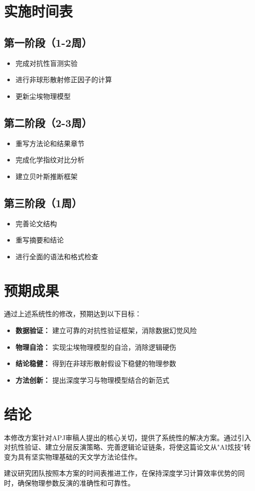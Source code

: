 \documentclass[12pt]{article}
\begin{document}
\section{实施时间表}

\subsection{第一阶段（1-2周）}

\begin{itemize}[leftmargin=*]
\item 完成对抗性盲测实验
\item 进行非球形散射修正因子的计算
\item 更新尘埃物理模型
\end{itemize}

\subsection{第二阶段（2-3周）}

\begin{itemize}[leftmargin=*]
\item 重写方法论和结果章节
\item 完成化学指纹对比分析
\item 建立贝叶斯推断框架
\end{itemize}

\subsection{第三阶段（1周）}

\begin{itemize}[leftmargin=*]
\item 完善论文结构
\item 重写摘要和结论
\item 进行全面的语法和格式检查
\end{itemize}

\section{预期成果}

通过上述系统性的修改，预期达到以下目标：

\begin{itemize}[leftmargin=*]
\item \textbf{数据验证：} 建立可靠的对抗性验证框架，消除数据幻觉风险
\item \textbf{物理自洽：} 实现尘埃物理模型的自洽，消除逻辑硬伤
\item \textbf{结论稳健：} 得到在非球形散射假设下稳健的物理参数
\item \textbf{方法创新：} 提出深度学习与物理模型结合的新范式
\end{itemize}

\section{结论}

本修改方案针对APJ审稿人提出的核心关切，提供了系统性的解决方案。通过引入对抗性验证、建立分层反演策略、完善逻辑论证链条，将使这篇论文从"AI炫技"转变为具有坚实物理基础的天文学方法论佳作。

建议研究团队按照本方案的时间表推进工作，在保持深度学习计算效率优势的同时，确保物理参数反演的准确性和可靠性。
\end{document}
